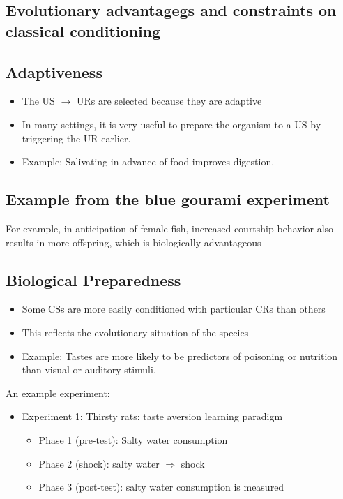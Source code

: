 \subsection{Evolutionary advantagegs and constraints on classical conditioning}
\subsection{Adaptiveness}
\begin{itemize}
    \item The US $\rightarrow$ URs are selected because they are adaptive
    \item In many settings, it is very useful to prepare the organism to a US by triggering the UR earlier.
    \item Example: Salivating in advance of food improves digestion.
\end{itemize}

\subsection{Example from the blue gourami experiment}
For example, in anticipation of female fish, increased courtship behavior also results in more offspring, which is
biologically advantageous

\subsection{Biological Preparedness}
\begin{itemize}
    \item Some CSs are more easily conditioned with particular CRs than others
    \item This reflects the evolutionary situation of the species
    \item Example: Tastes are more likely to be predictors of poisoning or nutrition than visual or auditory stimuli.
\end{itemize}

An example experiment:
\begin{itemize}
    \item Experiment 1: Thirsty rats: taste aversion learning paradigm
    \begin{itemize}
        \item Phase 1 (pre-test): Salty water consumption
        \item Phase 2 (shock): salty water $\Rightarrow$ shock
        \item Phase 3 (post-test): salty water consumption is measured
    \end{itemize}
\end{itemize}

